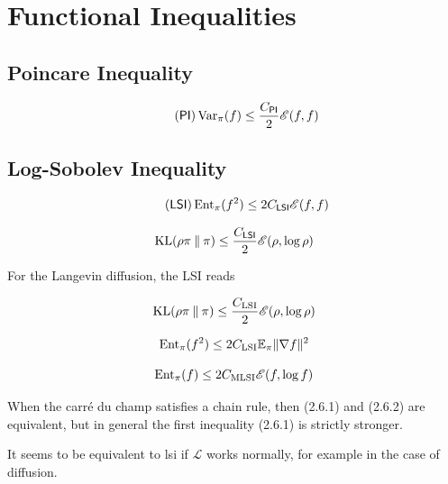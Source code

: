 \section{Functional Inequalities}

\subsection{Poincare Inequality}

\begin{definition}
    \begin{equation*}\tag{$\mathsf{PI}$}
        \var_{\pi}(f)\leq \frac{C_\mathsf{PI}}{2}\mathscr{E} (f,f )
    \end{equation*}
\end{definition}


\subsection{Log-Sobolev Inequality}

\begin{definition}
    \citep{bakry}
    \begin{equation*}\tag{$\mathsf{LSI}$}
        \Ent_\pi(f^2)\leq 2C_\mathsf{LSI}\mathscr{E}(f,f)
    \end{equation*}

    \cite{chewi}
    \begin{equation*}
        \operatorname{KL}(\rho\pi \mathbin{\|} \pi)\leq \frac{C_\mathsf{LSI}}{2}\mathscr{E} (\rho,\log\rho )
    \end{equation*}

\end{definition}

\begin{example}
    For the Langevin diffusion, the LSI reads
    
    \begin{equation*}
        \operatorname{KL}(\rho\pi \mathbin{\|} \pi)\leq \frac{C_\textnormal{LSI}}{2}\mathscr{E} (\rho,\log\rho )
    \end{equation*}


    \begin{equation*}
        \operatorname{Ent}_\pi(f^2)\leq 2C_\textnormal{LSI}\mathbb{E}_\pi \|\nabla f\|^2  
    \end{equation*}
\end{example}


\begin{definition}
    \citep{vanhandel}
    \begin{equation*}
        \operatorname{Ent}_\pi(f)\leq 2C_\textnormal{MLSI}\mathscr{E}(f,\log f)
    \end{equation*}
\end{definition}
\begin{remark}
    When the carr\'e du champ satisfies a chain rule, then (2.6.1) and (2.6.2) are equivalent, but in general the first inequality (2.6.1) is strictly stronger.
\end{remark}
It seems to be equivalent to lsi if $\mathscr{L}$ works normally, for example in the case of diffusion.


